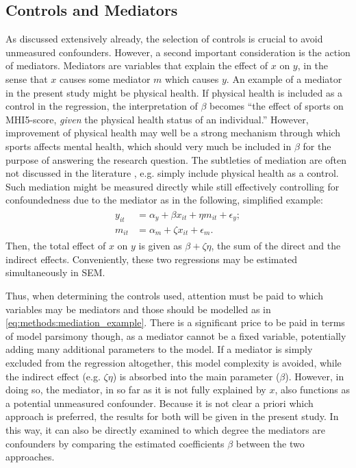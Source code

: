 \subsection{Controls and Mediators}
\label{sec:methods:controls_mediators}
As discussed extensively already, the selection of controls is crucial to avoid unmeasured confounders. However,
a second important consideration is the action of mediators. Mediators are variables that explain the effect
of $x$ on $y$, in the sense that $x$ causes some mediator $m$ which causes $y$. An example of a mediator in the present
study might be physical health. If physical health is included as a control in the regression, the interpretation of $\beta$
becomes ``the effect of sports on MHI5-score, \textit{given} the physical health status of an individual.'' However,
improvement of physical health may well be a strong mechanism through which sports affects mental health, which
should very much be included in $\beta$ for the purpose of answering the research question. The subtleties of mediation
are often not discussed in the literature \cite{imbens2024causal}, e.g.  simply include physical health as a control.
Such mediation might be measured directly while still effectively controlling for confoundedness due to the mediator as
in the following, simplified example:
\begin{align}
\begin{split}
    \label{eq:methods:mediation_example}
    y_{it} &= \alpha_y + \beta x_{it} + \eta m_{it} + \epsilon_y; \\
    m_{it} &= \alpha_m + \zeta x_{it} + \epsilon_m.
\end{split}
\end{align}
Then, the total effect of $x$ on $y$ is given as $\beta + \zeta \eta$, the sum of the direct and the indirect effects.
Conveniently, these two regressions may be estimated simultaneously in SEM.

Thus, when determining the controls used, attention must be paid to which variables may be mediators and those should be
modelled as in \cref{eq:methods:mediation_example}. There is a significant price to be paid in terms of model parsimony
though, as a mediator cannot be a fixed variable, potentially adding many additional parameters to the model.
If a mediator is simply excluded from the regression altogether, this model complexity is avoided, while the indirect
effect (e.g. $\zeta \eta$) is absorbed into the main parameter ($\beta$). However, in doing so, the mediator, in so far
as it is not fully explained by $x$, also functions as a potential unmeasured confounder.
Because it is not clear a priori which approach is preferred, the results for both will be given in the present study.
In this way, it can also be directly examined to which degree the mediators are confounders by comparing
the estimated coefficients $\beta$ between the two approaches.

